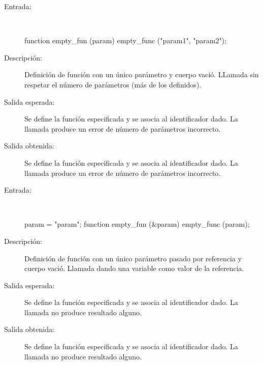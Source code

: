 	\begin{description}
		\item [Entrada:] \hfill \\
\begin{myverbatim}
   function empty_fun (param) { } 
   empty_func ("param1", "param2");
\end{myverbatim}
		\item [Descripción:] Definición de función con un único parámetro y cuerpo vació. LLamada sin respetar el número de parámetros (más de los definidos).
		\item [Salida esperada:] Se define la función especificada y se asocia al identificador dado. La llamada produce un error de número de parámetros incorrecto.
		\item [Salida obtenida:] Se define la función especificada y se asocia al identificador dado. La llamada produce un error de número de parámetros incorrecto.
	\end{description}


	\begin{description}
		\item [Entrada:] \hfill \\
\begin{myverbatim}
   param = "param";
   function empty_fun (&param) { } 
   empty_func (param);
\end{myverbatim}
		\item [Descripción:] Definición de función con un único parámetro pasado por referencia y cuerpo vació. Llamada dando una variable como valor de la referencia.
		\item [Salida esperada:] Se define la función especificada y se asocia al identificador dado. La llamada no produce resultado alguno.
		\item [Salida obtenida:] Se define la función especificada y se asocia al identificador dado. La llamada no produce resultado alguno.
	\end{description}

